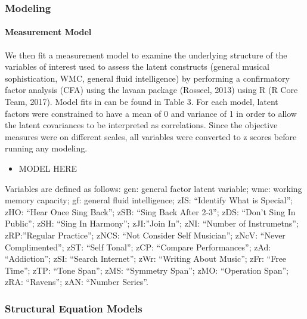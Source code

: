 \documentclass[]{book}
\providecommand{\tightlist}{%
  \setlength{\itemsep}{0pt}\setlength{\parskip}{0pt}}
\let\oldparagraph\paragraph
\renewcommand{\paragraph}[1]{\oldparagraph{#1}\mbox{}}
\theoremstyle{definition}
\theoremstyle{definition}
\theoremstyle{definition}
\theoremstyle{remark}
\begin{document}
\hypertarget{modeling}{%
\subsubsection{Modeling}\label{modeling}}

\hypertarget{measurement-model}{%
\paragraph{Measurement Model}\label{measurement-model}}

We then fit a measurement model to examine the underlying structure of
the variables of interest used to assess the latent constructs (general
musical sophistication, WMC, general fluid intelligence) by performing a
confirmatory factor analysis (CFA) using the lavaan package (Rosseel,
2013) using R (R Core Team, 2017). Model fits in can be found in Table
3. For each model, latent factors were constrained to have a mean of 0
and variance of 1 in order to allow the latent covariances to be
interpreted as correlations. Since the objective measures were on
different scales, all variables were converted to z scores before
running any modeling.

\begin{itemize}
\tightlist
\item
  MODEL HERE
\end{itemize}

Variables are defined as follows: gen: general factor latent variable;
wmc: working memory capacity; gf: general fluid intelligence; zIS:
``Identify What is Special''; zHO: ``Hear Once Sing Back''; zSB: ``Sing
Back After 2-3''; zDS: ``Don't Sing In Public''; zSH: ``Sing In
Harmony''; zJI:''Join In''; zNI: ``Number of Instrumetns'';
zRP:''Regular Practice''; zNCS: ``Not Consider Self Musician''; zNcV:
``Never Complimented''; zST: ``Self Tonal''; zCP: ``Compare
Performances''; zAd: ``Addiction''; zSI: ``Search Internet''; zWr:
``Writing About Music''; zFr: ``Free Time''; zTP: ``Tone Span''; zMS:
``Symmetry Span''; zMO: ``Operation Span''; zRA: ``Ravens''; zAN:
``Number Series''.

\hypertarget{structural-equation-models}{%
\subsubsection{Structural Equation
Models}\label{structural-equation-models}}
\end{document}
